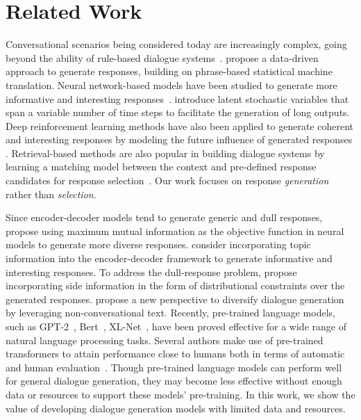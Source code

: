\documentclass[sigconf]{acmart}
\begin{document}
\section{Related Work}
Conversational scenarios being considered today are increasingly complex, going beyond the ability of rule-based dialogue systems~\citep{weizenbaum1966eliza}. \citet{ritter2011data} propose a data-driven approach to generate responses, building on phrase-based statistical machine translation. Neural network-based models have been studied to generate more informative and interesting responses~\citep{sordoni2015neural,vinyals2015neural,serban2016hred}.
\citet{serban2017hierarchical} introduce latent stochastic variables that span a variable number of time steps to facilitate the generation of long outputs. 
Deep reinforcement learning methods have also been applied to generate coherent and interesting responses by modeling the future influence of generated responses \citep{li2016deep,li2019dialogue}.  Retrieval-based methods are also popular in building dialogue systems by learning a matching model between the context and pre-defined response candidates for response selection~\citep{qiu2020if,tao2019multi,wu2016sequential,gu2020speaker}. Our work focuses on response \emph{generation} rather than \emph{selection}.

Since encoder-decoder models tend to generate generic and dull responses, \citet{li2015diversity} propose using maximum mutual information as the objective function in neural models to generate more diverse responses.
\citet{xing2017topic} consider incorporating topic information into the encoder-decoder framework to generate informative and interesting responses. 
To address the dull-response problem, \citet{baheti2018generating} propose incorporating side information in the form of distributional constraints over the generated responses. \citet{su2020diversifying} propose a new perspective to diversify dialogue generation by leveraging non-conversational text. Recently, pre-trained language models, such as GPT-2~\citep{radford2019language}, Bert~\citep{devlin2018bert}, XL-Net~\citep{yang2019xlnet}, have been proved effective for a wide range of natural language processing tasks. Several authors make use of pre-trained transformers to attain performance close to humans both in terms of automatic and human evaluation~\citep{zhang2019dialogpt,wolf2019transfertransfo,golovanov2019large}. Though pre-trained language models can perform well for general dialogue generation, they may become less effective without enough data or resources to support these models' pre-training. In this work, we show the value of developing dialogue generation models with limited data and resources.
\end{document}

